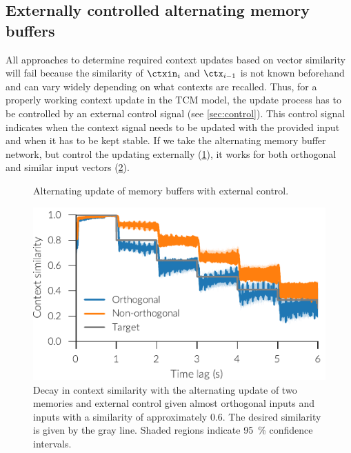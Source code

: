 \subsection{Externally controlled alternating memory buffers}
All approaches to determine required context updates based on vector similarity will fail because the similarity of $\ctxin_i$ and $\ctx_{i-1}$ is not known beforehand and can vary widely depending on what contexts are recalled.
Thus, for a properly working context update in the TCM model, the update process has to be controlled by an external control signal (see \cref{sec:control}).
This control signal indicates when the context signal needs to be updated with the provided input and when it has to be kept stable.
If we take the alternating memory buffer network, but control the updating externally (\cref{fig:ctx-ext-ctrl}), it works for both orthogonal and similar input vectors (\cref{fig:ext-amb}).
\begin{figure}
    \centering
    \caption{Alternating update of memory buffers with external control.}\label{fig:ctx-ext-ctrl}
\end{figure}
\begin{figure}
    \centering
    \includegraphics{figures/context-analysis/ext-amb}
    \caption[Decay in context similarity with the alternating update of two memories and external control.]{
        Decay in context similarity with the alternating update of two memories and external control given almost orthogonal inputs and inputs with a similarity of approximately \num{0.6}.
        The desired similarity is given by the gray line. Shaded regions indicate \SI{95}{\percent} confidence intervals.}\label{fig:ext-amb}
\end{figure}

